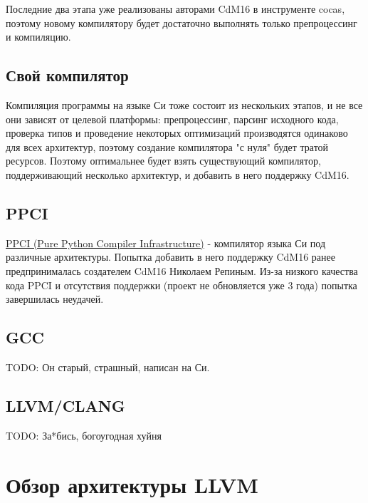 \documentclass[a4paper,14pt]{extarticle}
\begin{document}
Последние два этапа уже реализованы авторами CdM16 в инструменте cocas, поэтому новому компилятору будет достаточно выполнять только препроцессинг и компиляцию. 

\subsection{Свой компилятор}

Компиляция программы на языке Си тоже состоит из нескольких этапов, и не все они зависят от целевой платформы:
препроцессинг, парсинг исходного кода, проверка типов и проведение некоторых оптимизаций производятся одинаково 
для всех архитектур, поэтому создание компилятора "с нуля" будет тратой ресурсов. 
Поэтому оптимальнее будет взять существующий компилятор, поддерживающий несколько архитектур, и добавить в него
поддержку CdM16.

\subsection{PPCI}

\href{https://github.com/windelbouwman/ppci}{PPCI (Pure Python Compiler Infrastructure)} - компилятор языка Си под различные архитектуры. Попытка добавить в него поддержку CdM16 ранее предпринималась создателем CdM16 Николаем Репиным. Из-за низкого качества кода PPCI и отсутствия поддержки (проект не обновляется уже 3 года) попытка завершилась неудачей.

\subsection{GCC}

TODO: Он старый, страшный, написан на Си.

\subsection{LLVM/CLANG}

TODO: За*бись, богоугодная хуйня

\pagebreak
\section{Обзор архитектуры LLVM}
\end{document}
